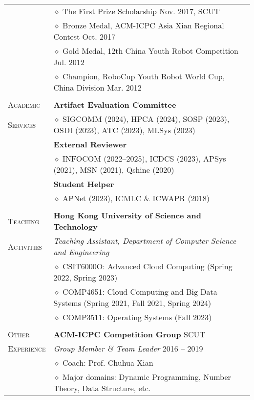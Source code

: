 \documentclass[letterpaper, 10pt]{article}
\begin{document}
\begin{longtable}{p{0.7in}p{6.0in}}
& $\diamond$ The First Prize Scholarship \hfill Nov. 2017, SCUT \\

& $\diamond$ Bronze Medal, ACM-ICPC Asia Xian Regional Contest \hfill Oct. 2017 \\

& $\diamond$ Gold Medal, 12th China Youth Robot Competition \hfill Jul. 2012 \\

& $\diamond$ Champion, RoboCup Youth Robot World Cup, China Division \hfill Mar. 2012 \\

& \\

{\textsc{Academic}}
& \textbf{Artifact Evaluation Committee} \\
{\textsc{Services}}
& $\diamond$ SIGCOMM (2024), HPCA (2024), SOSP (2023), OSDI (2023), ATC (2023), MLSys (2023) \\
& \textbf{External Reviewer} \\
& $\diamond$ INFOCOM (2022--2025), ICDCS (2023), APSys (2021), MSN (2021), Qshine (2020) \\
& \textbf{Student Helper} \\
& $\diamond$ APNet (2023), ICMLC \& ICWAPR (2018) \\
& \\

{\textsc{Teaching }}
& \textbf{Hong Kong University of Science and Technology} \\
{\textsc{Activities}}
& \textit{Teaching Assistant, Department of Computer Science and Engineering} \\
& $\diamond$ CSIT6000O: Advanced Cloud Computing (Spring 2022, Spring 2023) \\
& $\diamond$ COMP4651: Cloud Computing and Big Data Systems (Spring 2021, Fall 2021, Spring 2024) \\
& $\diamond$ COMP3511: Operating Systems (Fall 2023) \\
& \\

{\textsc{Other}}
& \textbf{ACM-ICPC Competition Group} \hfill SCUT \\
{\textsc{Experience}}
& \textit{Group Member \& Team Leader} \hfill 2016 -- 2019 \\
& $\diamond$ Coach: Prof. Chuhua Xian \\
& $\diamond$ Major domains: Dynamic Programming, Number Theory, Data Structure, etc. \\


\end{longtable}
\end{document}
